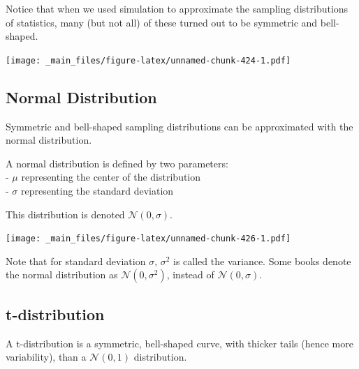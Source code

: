 \documentclass[]{book}
\begin{document}
Notice that when we used simulation to approximate the sampling
distributions of statistics, many (but not all) of these turned out to
be symmetric and bell-shaped.

\texttt{[image: \_main\_files/figure-latex/unnamed-chunk-424-1.pdf]}

\subsection{Normal Distribution}\label{normal-distribution}

Symmetric and bell-shaped sampling distributions can be approximated
with the normal distribution.

A normal distribution is defined by two parameters:\\
- \(\mu\) representing the center of the distribution\\
- \(\sigma\) representing the standard deviation

This distribution is denoted \(\mathcal{N}(0, \sigma)\).

\texttt{[image: \_main\_files/figure-latex/unnamed-chunk-426-1.pdf]}

Note that for standard deviation \(\sigma\), \(\sigma^2\) is called the
variance. Some books denote the normal distribution as
\(\mathcal{N}(0, \sigma^2)\), instead of \(\mathcal{N}(0,\sigma)\).

\subsection{t-distribution}\label{t-distribution}

A t-distribution is a symmetric, bell-shaped curve, with thicker tails
(hence more variability), than a \(\mathcal{N}(0,1)\) distribution.
\end{document}
